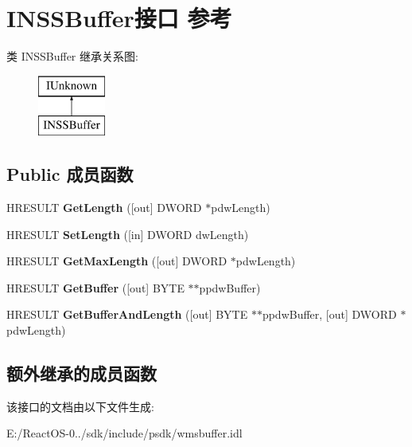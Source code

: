 \hypertarget{interface_i_n_s_s_buffer}{}\section{I\+N\+S\+S\+Buffer接口 参考}
\label{interface_i_n_s_s_buffer}
类 I\+N\+S\+S\+Buffer 继承关系图\+:\begin{figure}[H]
\begin{center}
\leavevmode
\includegraphics[height=2.000000cm]{interface_i_n_s_s_buffer}
\end{center}
\end{figure}
\subsection*{Public 成员函数}
\begin{DoxyCompactItemize}
\item 
\mbox{\label{interface_i_n_s_s_buffer_a9135e6b00b2fcc7744c680b2a5577ed7}} 
H\+R\+E\+S\+U\+LT {\bfseries Get\+Length} (\mbox{[}out\mbox{]} D\+W\+O\+RD $\ast$pdw\+Length)
\item 
\mbox{\label{interface_i_n_s_s_buffer_ad89223c0b75e04e646d87bc0e4098d7a}} 
H\+R\+E\+S\+U\+LT {\bfseries Set\+Length} (\mbox{[}in\mbox{]} D\+W\+O\+RD dw\+Length)
\item 
\mbox{\label{interface_i_n_s_s_buffer_a047903433846dacb3853f278ba8203a0}} 
H\+R\+E\+S\+U\+LT {\bfseries Get\+Max\+Length} (\mbox{[}out\mbox{]} D\+W\+O\+RD $\ast$pdw\+Length)
\item 
\mbox{\label{interface_i_n_s_s_buffer_a6f27ec75c392c27ac139038cf493d5b8}} 
H\+R\+E\+S\+U\+LT {\bfseries Get\+Buffer} (\mbox{[}out\mbox{]} B\+Y\+TE $\ast$$\ast$ppdw\+Buffer)
\item 
\mbox{\label{interface_i_n_s_s_buffer_a87919a62f5568a45866370082c8ab183}} 
H\+R\+E\+S\+U\+LT {\bfseries Get\+Buffer\+And\+Length} (\mbox{[}out\mbox{]} B\+Y\+TE $\ast$$\ast$ppdw\+Buffer, \mbox{[}out\mbox{]} D\+W\+O\+RD $\ast$pdw\+Length)
\end{DoxyCompactItemize}
\subsection*{额外继承的成员函数}


该接口的文档由以下文件生成\+:\begin{DoxyCompactItemize}
\item 
E\+:/\+React\+O\+S-\/0../sdk/include/psdk/wmsbuffer.\+idl\end{DoxyCompactItemize}
